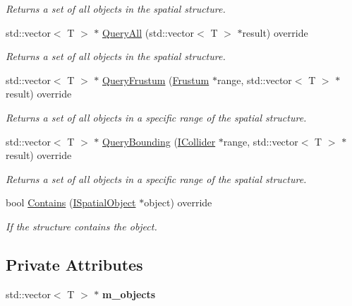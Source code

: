 \begin{DoxyCompactItemize}
\begin{DoxyCompactList}\small\item\em Returns a set of all objects in the spatial structure. \end{DoxyCompactList}\item 
std\+::vector$<$ T $>$ $\ast$ \hyperlink{class_flounder_1_1_structure_basic_a1d85dcd21ad7547b1113eee8e6dc7b8e}{Query\+All} (std\+::vector$<$ T $>$ $\ast$result) override
\begin{DoxyCompactList}\small\item\em Returns a set of all objects in the spatial structure. \end{DoxyCompactList}\item 
std\+::vector$<$ T $>$ $\ast$ \hyperlink{class_flounder_1_1_structure_basic_afdd33be8810c3f2a55ce161b0d956fa2}{Query\+Frustum} (\hyperlink{class_flounder_1_1_frustum}{Frustum} $\ast$range, std\+::vector$<$ T $>$ $\ast$result) override
\begin{DoxyCompactList}\small\item\em Returns a set of all objects in a specific range of the spatial structure. \end{DoxyCompactList}\item 
std\+::vector$<$ T $>$ $\ast$ \hyperlink{class_flounder_1_1_structure_basic_aa0f666b4212caeafcee431376a7f25cd}{Query\+Bounding} (\hyperlink{class_flounder_1_1_i_collider}{I\+Collider} $\ast$range, std\+::vector$<$ T $>$ $\ast$result) override
\begin{DoxyCompactList}\small\item\em Returns a set of all objects in a specific range of the spatial structure. \end{DoxyCompactList}\item 
bool \hyperlink{class_flounder_1_1_structure_basic_ab49e0b2fa705150cb4a0f1eb95a8d096}{Contains} (\hyperlink{class_flounder_1_1_i_spatial_object}{I\+Spatial\+Object} $\ast$object) override
\begin{DoxyCompactList}\small\item\em If the structure contains the object. \end{DoxyCompactList}\end{DoxyCompactItemize}
\subsection*{Private Attributes}
\begin{DoxyCompactItemize}
\item 
\mbox{\label{class_flounder_1_1_structure_basic_ad45427600fd34ac80cceb51cd8748f12}} 
std\+::vector$<$ T $>$ $\ast$ {\bfseries m\+\_\+objects}
\end{DoxyCompactItemize}



